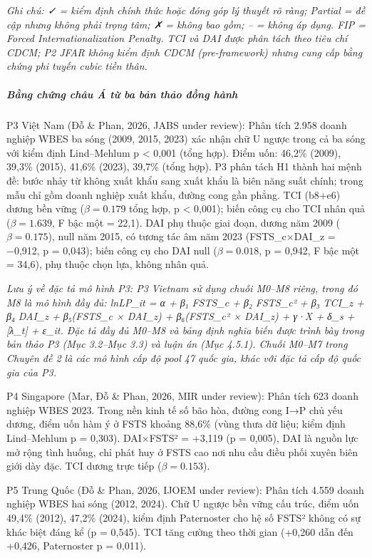 \documentclass[12pt,a4paper]{article}
\begin{document}
\emph{Ghi chú: ✓ = kiểm định chính thức hoặc đóng góp lý thuyết rõ ràng;
Partial = đề cập nhưng không phải trọng tâm; ✗ = không bao gồm; -- =
không áp dụng. FIP = Forced Internationalization Penalty. TCI và DAI
được phân tách theo tiêu chí CDCM; P2 JFAR không kiểm định CDCM
(pre-framework) nhưng cung cấp bằng chứng phi tuyến cubic tiền thân.}

\hypertarget{bux1eb1ng-chux1ee9ng-chuxe2u-uxe1-tux1eeb-ba-bux1ea3n-thux1ea3o-ux111ux1ed3ng-huxe0nh}{%
\subparagraph{Bằng chứng châu Á từ ba bản thảo đồng
hành}\label{bux1eb1ng-chux1ee9ng-chuxe2u-uxe1-tux1eeb-ba-bux1ea3n-thux1ea3o-ux111ux1ed3ng-huxe0nh}}

P3 Việt Nam (Đỗ \& Phan, 2026, JABS under review): Phân tích 2.958 doanh
nghiệp WBES ba sóng (2009, 2015, 2023) xác nhận chữ U ngược trong cả ba
sóng với kiểm định Lind--Mehlum p \textless{} 0,001 (tổng hợp). Điểm
uốn: 46,2\% (2009), 39,3\% (2015), 41,6\% (2023), 39,7\% (tổng hợp). P3
phân tách H1 thành hai mệnh đề: bước nhảy từ không xuất khẩu sang xuất
khẩu là biên năng suất chính; trong mẫu chỉ gồm doanh nghiệp xuất khẩu,
đường cong gần phẳng. TCI (b8+e6) dương bền vững (\(\beta = 0.179\) tổng
hợp, p \textless{} 0,001); biến công cụ cho TCI nhân quả
(\(\beta = 1.639\), F bậc một = 22,1). DAI phụ thuộc giai đoạn, dương
năm 2009 (\(\beta = 0.175\)), null năm 2015, có tương tác âm năm 2023
(FSTS\_c×DAI\_z = −0,912, p = 0,043); biến công cụ cho DAI null
(\(\beta = 0.018\), p = 0,942, F bậc một = 34,6), phụ thuộc chọn lựa,
không nhân quả.

\emph{Lưu ý về đặc tả mô hình P3: P3 Vietnam sử dụng chuỗi M0--M8 riêng,
trong đó M8 là mô hình đầy đủ: lnLP\_it = α + β₁ FSTS\_c + β₂ FSTS\_c² +
β₃ TCI\_z + β₄ DAI\_z + β₅(FSTS\_c × DAI\_z) + β₆(FSTS\_c² × DAI\_z) +
γ·X + δ\_s + {[}λ\_t{]} + ε\_it. Đặc tả đầy đủ M0--M8 và bảng định nghĩa
biến được trình bày trong bản thảo P3 (Mục 3.2--Mục 3.3) và luận án (Mục
4.5.1). Chuỗi M0--M7 trong Chuyên đề 2 là các mô hình cấp độ pool 47
quốc gia, khác với đặc tả cấp độ quốc gia của P3.}

P4 Singapore (Mar, Đỗ \& Phan, 2026, MIR under review): Phân tích 623
doanh nghiệp WBES 2023. Trong nền kinh tế số bão hòa, đường cong I→P chủ
yếu dương, điểm uốn hàm ý ở FSTS khoảng 88,6\% (vùng thưa dữ liệu; kiểm
định Lind--Mehlum p = 0,303). DAI×FSTS² = +3,119 (p = 0,005), DAI là
nguồn lực mở rộng tình huống, chỉ phát huy ở FSTS cao nơi nhu cầu điều
phối xuyên biên giới dày đặc. TCI dương trực tiếp (\(\beta = 0.153\)).

P5 Trung Quốc (Đỗ \& Phan, 2026, IJOEM under review): Phân tích 4.559
doanh nghiệp WBES hai sóng (2012, 2024). Chữ U ngược bền vững cấu trúc,
điểm uốn 49,4\% (2012), 47,2\% (2024), kiểm định Paternoster cho hệ số
FSTS² không có sự khác biệt đáng kể (p = 0,545). TCI tăng cường theo
thời gian (+0,260 dẫn đến +0,426, Paternoster p = 0,011).
\end{document}
